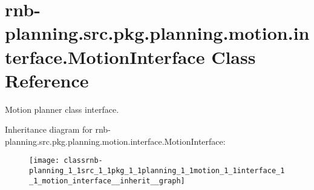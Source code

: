\hypertarget{classrnb-planning_1_1src_1_1pkg_1_1planning_1_1motion_1_1interface_1_1_motion_interface}{}\section{rnb-\/planning.src.\+pkg.\+planning.\+motion.\+interface.\+Motion\+Interface Class Reference}
\label{classrnb-planning_1_1src_1_1pkg_1_1planning_1_1motion_1_1interface_1_1_motion_interface}


Motion planner class interface.  




Inheritance diagram for rnb-\/planning.src.\+pkg.\+planning.\+motion.\+interface.\+Motion\+Interface\+:\nopagebreak
\begin{figure}[H]
\begin{center}
\leavevmode
\texttt{[image: classrnb-planning\_1\_1src\_1\_1pkg\_1\_1planning\_1\_1motion\_1\_1interface\_1\_1\_motion\_interface\_\_inherit\_\_graph]}
\end{center}
\end{figure}
